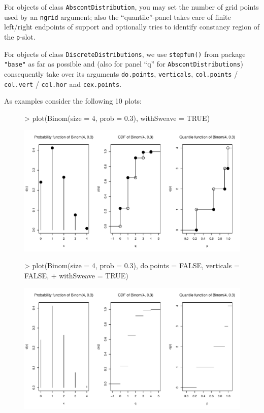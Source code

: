 \documentclass[11pt]{article}
\newcommand{\code}[1]{{\tt #1}}
\newcommand{\pkg}[1]{{\tt "#1"}}
\begin{document}
For objects of class \code{AbscontDistribution}, you may set the number of grid 
points used by an \code{ngrid} argument; also the ``quantile''-panel
takes care of finite left/right endpoints of support and optionally tries
to identify constancy region of the \code{p}-slot. 

For objects of class \code{DiscreteDistributions}, we use \code{stepfun()} from
package \pkg{base} as far as possible and (also for panel ``q'' for
\code{AbscontDistributions}) consequently take over its arguments 
\code{do.points}, \code{verticals}, \code{col.points} / \code{col.vert} / 
\code{col.hor} and \code{cex.points}.

As examples consider the following 10 plots:


\begin{figure}[p]
\begin{Schunk}
\begin{Sinput}
> plot(Binom(size = 4, prob = 0.3), withSweave = TRUE)
\end{Sinput}
\end{Schunk}
\includegraphics{distr-plotex1}
\end{figure}
\begin{figure}[p]
\begin{Schunk}
\begin{Sinput}
> plot(Binom(size = 4, prob = 0.3), do.points = FALSE, verticals = FALSE,
+      withSweave = TRUE)
\end{Sinput}
\end{Schunk}
\includegraphics{distr-plotex2}
\end{figure}
\end{document}
